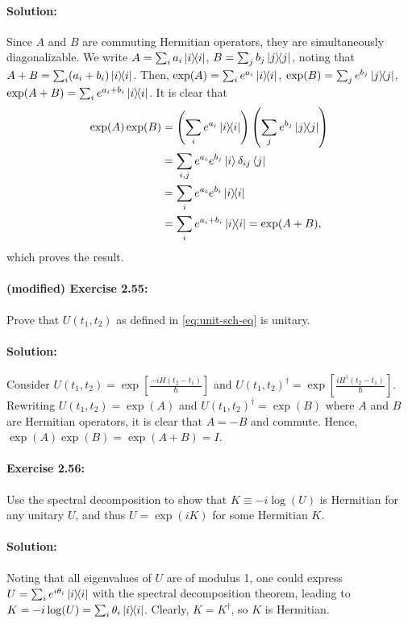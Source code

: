 \paragraph{Solution:} Since $A$ and $B$ are commuting Hermitian operators, they
are simultaneously diagonalizable. We write $A = \sum_i a_i\ketbra{i}{i}$,
$B = \sum_j b_j\ketbra{j}{j}$, noting that $A + B = \sum_i (a_i + b_i)
\ketbra{i}{i}$. Then, $\exp(A) = \sum_i e^{a_i}\ketbra{i}{i}$, $\exp(B) =
\sum_j e^{b_j}\ketbra{j}{j}$, $\exp(A + B) = \sum_i e^{a_i + b_i}
\ketbra{i}{i}$. It is clear that \begin{align*}
  \exp(A)\exp(B)
    &= \left(\sum_i e^{a_i}\ketbra{i}{i}\right)\left(\sum_j e^{b_j}
      \ketbra{j}{j}\right) \\
    &= \sum_{i, j} e^{a_i}e^{b_j}\ket{i}\delta_{ij}\bra{j} \\
    &= \sum_i e^{a_i}e^{b_i}\ketbra{i}{i} \\
    &= \sum_i e^{a_i + b_i}\ketbra{i}{i} = \exp(A + B),
\end{align*} which proves the result.

\paragraph{\cite{mikeandike} (modified) Exercise 2.55:} Prove that $U(t_1,
t_2)$ as defined in \eqref{eq:unit-sch-eq} is unitary.

\paragraph{Solution:} Consider $U(t_1, t_2) = \exp\left[\frac{-iH(t_2 - t_1)}
{\hbar}\right]$ and $U(t_1, t_2)^\dagger = \exp\left[\frac{iH^\dagger(t_2 -
t_1)}{\hbar}\right]$. Rewriting $U(t_1, t_2) = \exp(A)$ and $U(t_1,
t_2)^\dagger = \exp(B)$ where $A$ and $B$ are Hermitian operators, it is clear
that $A = -B$ and commute. Hence, $\exp(A)\exp(B) = \exp(A + B) = I$.

\paragraph{\cite{mikeandike} Exercise 2.56:} Use the spectral decomposition to
show that $K \equiv -i\log(U)$ is Hermitian for any unitary $U$, and thus $U =
\exp(iK)$ for some Hermitian $K$.

\paragraph{Solution:} Noting that all eigenvalues of $U$ are of modulus 1, one
could express $U = \sum_i e^{i\theta_i}\ketbra{i}{i}$ with the spectral
decomposition theorem, leading to $K = -i\log(U) = \sum_i \theta_i\ketbra{i}
{i}$. Clearly, $K = K^\dagger$, so $K$ is Hermitian.


